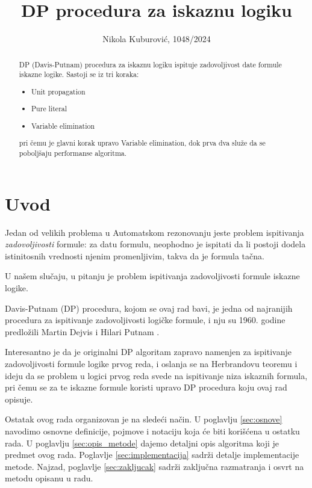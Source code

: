 \documentclass[a4paper,10pt]{article}
\title{DP procedura za iskaznu logiku}
\author{Nikola Kuburović, 1048/2024}
\begin{document}
\maketitle

\begin{abstract}
  DP (Davis-Putnam) procedura za iskaznu logiku ispituje zadovoljivost date formule iskazne logike.
  Sastoji se iz tri koraka:
  \begin{itemize}
    \item Unit propagation
    \item Pure literal
    \item Variable elimination
  \end{itemize}
  pri čemu je glavni korak upravo Variable elimination, dok prva dva služe da se poboljšaju performanse algoritma.
\end{abstract}

\section{Uvod}
Jedan od velikih problema u Automatskom rezonovanju jeste problem ispitivanja \emph{zadovoljivosti} formule:
za datu formulu, neophodno je ispitati da li postoji dodela istinitosnih vrednosti njenim promenljivim, takva da je formula tačna.

U našem slučaju, u pitanju je problem ispitivanja
zadovoljivosti formule iskazne logike.

Davis-Putnam (DP) procedura, kojom se ovaj rad bavi,
je jedna od najranijih procedura za ispitivanje zadovoljivosti logičke formule, i nju su 1960. godine
predložili Martin Dejvis i Hilari Putnam \cite{davis_putnam}.

Interesantno je da je originalni DP algoritam zapravo namenjen za ispitivanje zadovoljivosti formule logike prvog reda, i oslanja se na Herbrandovu teoremu i ideju
da se problem u logici prvog reda svede na ispitivanje
niza iskaznih formula, pri čemu se za te iskazne formule koristi upravo DP procedura koju ovaj rad opisuje.

Ostatak ovog rada organizovan je na sledeći način. U poglavlju \ref{sec:osnove} navodimo osnovne definicije, pojmove i notaciju koja će biti korišćena u ostatku rada. U poglavlju \ref{sec:opis_metode} dajemo detaljni opis algoritma koji je predmet ovog rada. Poglavlje \ref{sec:implementacija} sadrži detalje implementacije metode. Najzad, poglavlje \ref{sec:zakljucak} sadrži zaključna razmatranja i osvrt na metodu opisanu u radu.
\end{document}
